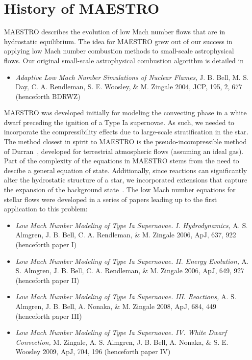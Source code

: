 \section{History of MAESTRO}

MAESTRO describes the evolution of low Mach number flows that are in
hydrostatic equilibrium.  The idea for MAESTRO grew out of our success
in applying low Mach number combustion methods to small-scale
astrophysical flows.  Our original small-scale astrophysical
combustion algorithm is detailed in
\begin{itemize}
\item {\em Adaptive Low Mach Number Simulations of Nuclear Flames,}
J. B. Bell, M. S. Day, C. A. Rendleman, S. E. Woosley, \& M. Zingale
2004, JCP, 195, 2, 677 (henceforth BDRWZ)
\end{itemize}

\noindent MAESTRO was developed initially for modeling the convecting
phase in a white dwarf preceding the ignition of a Type Ia supernovae.
As such, we needed to incorporate the compressibility effects due to
large-scale stratification in the star.  The method closest in spirit
to MAESTRO is the pseudo-incompressible method of
Durran~\cite{durran}, developed for terrestrial atmospheric flows
(assuming an ideal gas).  Part of the complexity of the equations in
MAESTRO stems from the need to descibe a general equation of state.
Additionally, since reactions can significantly alter the hydrostatic
structure of a star, we incorporated extensions that capture the
expansion of the background state~\cite{almgren:2000}.  The low Mach
number equations for stellar flows were developed in a series of
papers leading up to the first application to this problem:
\begin{itemize}
\item {\em Low Mach Number Modeling of Type Ia
  Supernovae. I. Hydrodynamics,} A. S. Almgren, J. B. Bell, 
  C. A. Rendleman, \& M. Zingale 2006, ApJ, 637, 922 (henceforth
  paper I)
\item {\em Low Mach Number Modeling of Type Ia Supernovae. II. Energy
  Evolution,} A. S. Almgren, J. B. Bell, C. A. Rendleman, \& M. Zingale
  2006, ApJ, 649, 927 (henceforth paper II)
\item {\em Low Mach Number Modeling of Type Ia Supernovae. III. Reactions,}
  A. S. Almgren, J. B. Bell, A. Nonaka, \& M. Zingale
  2008, ApJ, 684, 449 (henceforth paper III)
\item {\em Low Mach Number Modeling of Type Ia Supernovae. IV. White Dwarf Convection,}
  M. Zingale, A. S. Almgren, J. B. Bell, A. Nonaka, \& S. E. Woosley
  2009, ApJ, 704, 196 (henceforth paper IV)
\end{itemize}

